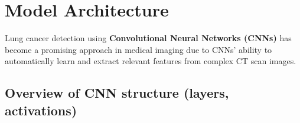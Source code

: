 \section{Model Architecture}

Lung cancer detection using \textbf{Convolutional Neural Networks (CNNs)} has become a promising 
approach in medical imaging due to CNNs’ ability to automatically learn and extract relevant 
features from complex CT scan images.

\subsection{Overview of CNN structure (layers, activations)}

